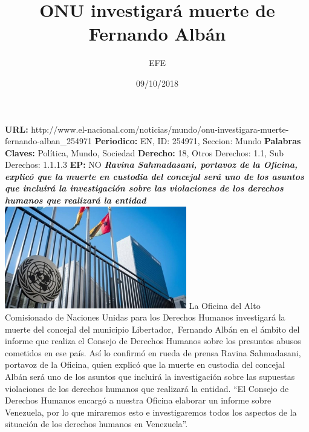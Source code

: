 \documentclass{article}%
\title{\textbf{ONU investigará muerte de Fernando Albán}}%
\author{EFE}%
\date{09/10/2018}%
\begin{document}
%
\normalsize%
\maketitle%
\textbf{URL: }%
http://www.el{-}nacional.com/noticias/mundo/onu{-}investigara{-}muerte{-}fernando{-}alban\_254971\newline%
%
\textbf{Periodico: }%
EN, %
ID: %
254971, %
Seccion: %
Mundo\newline%
%
\textbf{Palabras Claves: }%
Política, Mundo, Sociedad\newline%
%
\textbf{Derecho: }%
18, %
Otros Derechos: %
1.1, %
Sub Derechos: %
1.1.1.3\newline%
%
\textbf{EP: }%
NO\newline%
\newline%
%
\textbf{\textit{Ravina Sahmadasani, portavoz de la Oficina, explicó que la muerte en custodia del concejal será uno de los asuntos que incluirá la investigación sobre las violaciones de los derechos humanos que realizará la entidad}}%
\newline%
\newline%
%
\includegraphics[width=300px]{134.jpg}%
\newline%
%
La Oficina del Alto Comisionado de Naciones Unidas para los Derechos Humanos investigará la muerte del concejal del municipio Libertador,~Fernando Albán en el ámbito del informe que realiza el Consejo de Derechos Humanos sobre los presuntos abusos cometidos en ese país.%
\newline%
%
Así lo confirmó en rueda de prensa Ravina Sahmadasani, portavoz de la Oficina, quien explicó que la muerte en custodia del concejal Albán será uno de los asuntos que incluirá la investigación sobre las supuestas violaciones de los derechos humanos que realizará la entidad.%
\newline%
%
“El Consejo de Derechos Humanos encargó a nuestra Oficina elaborar un informe sobre Venezuela, por lo que miraremos esto e investigaremos todos los aspectos de la situación de los derechos humanos en Venezuela”.%
\newline%
\end{document}
